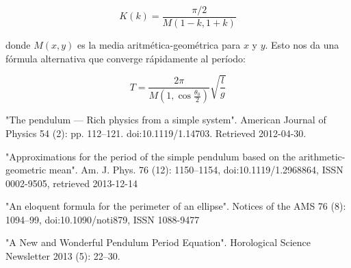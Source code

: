 \documentclass[DIV=calc, paper=a4, fontsize=12pt, twocolumn]{scrartcl}	 %
\begin{document}
$$K(k) = \frac{\pi/2}{M(1-k,1+k)}$$

donde $M(x,y)$ es la media aritmética-geométrica para $x$ y $y$. Esto nos da una fórmula alternativa que converge rápidamente al período:

$$ T = \frac{2\pi}{M(1,\cos{\frac{\theta_{0}}{2}})}\sqrt{\frac{l}{g}}$$


\begin{thebibliography}{99} %



\newblock "The pendulum — Rich physics from a simple system".
\newblock American Journal of Physics 54 (2): pp. 112–121. doi:10.1119/1.14703. Retrieved 2012-04-30.

\newblock "Approximations for the period of the simple pendulum based on the arithmetic-geometric mean".
\newblock  Am. J. Phys. 76 (12): 1150–1154, doi:10.1119/1.2968864, ISSN 0002-9505, retrieved 2013-12-14

\newblock "An eloquent formula for the perimeter of an ellipse".
\newblock  Notices of the AMS 76 (8): 1094–99, doi:10.1090/noti879, ISSN 1088-9477

\newblock "A New and Wonderful Pendulum Period Equation".
\newblock  Horological Science Newsletter 2013 (5): 22–30.

\end{thebibliography}

\end{document}
